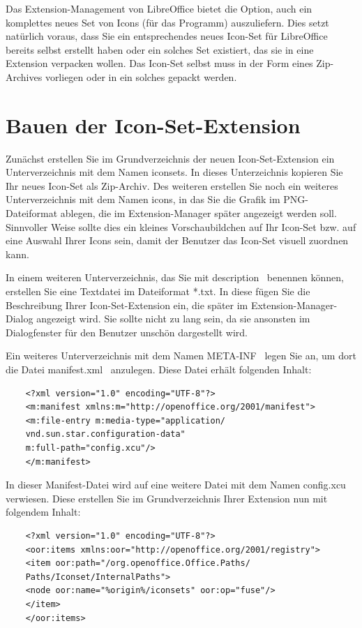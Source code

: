 \documentclass[12pt,a4paper,titlepage]{book}
\begin{document}
Das Extension-Management von LibreOffice bietet die Option, auch ein komplettes neues Set von Icons (für das Programm) auszuliefern. Dies setzt natürlich voraus, dass Sie ein
entsprechendes neues Icon-Set für LibreOffice bereits selbst erstellt haben oder ein solches Set existiert, das sie in eine Extension verpacken wollen. Das Icon-Set selbst muss in der Form eines Zip-Archives vorliegen oder in ein solches gepackt werden.

\section{Bauen der Icon-Set-Extension}

Zunächst erstellen Sie im Grundverzeichnis der neuen Icon-Set-Extension ein Unterverzeichnis mit dem Namen \glqq iconsets\grqq. In dieses Unterzeichnis kopieren Sie Ihr neues Icon-Set als Zip-Archiv. Des weiteren erstellen Sie noch ein weiteres Unterverzeichnis mit dem Namen \glqq icons\grqq, in das Sie die Grafik im PNG-Dateiformat ablegen, die im Extension-Manager später angezeigt werden soll. Sinnvoller Weise sollte dies ein kleines Vorschaubildchen auf Ihr Icon-Set bzw. auf eine Auswahl Ihrer Icons sein, damit der Benutzer das Icon-Set visuell zuordnen 
kann.

In einem weiteren Unterverzeichnis, das Sie mit \glqq description\grqq~ benennen können, erstellen Sie eine Textdatei im Dateiformat *.txt. In diese fügen Sie die Beschreibung Ihrer Icon-Set-Extension ein, die später im Extension-Manager-Dialog angezeigt wird. Sie sollte nicht zu lang sein, da sie ansonsten im Dialogfenster für den Benutzer unschön dargestellt wird.

Ein weiteres Unterverzeichnis mit dem Namen \glqq META-INF\grqq~ legen Sie an, um dort die Datei \glqq manifest.xml\grqq~ anzulegen. Diese Datei erhält folgenden Inhalt:

\begin{lstlisting}
	<?xml version="1.0" encoding="UTF-8"?>
	<m:manifest xmlns:m="http://openoffice.org/2001/manifest">
	<m:file-entry m:media-type="application/
	vnd.sun.star.configuration-data"
	m:full-path="config.xcu"/>
	</m:manifest>
\end{lstlisting}

In dieser Manifest-Datei wird auf eine weitere Datei mit dem Namen \glqq config.xcu\grqq~ verwiesen. Diese erstellen Sie im Grundverzeichnis Ihrer Extension nun mit folgendem Inhalt:

\begin{lstlisting}
	<?xml version="1.0" encoding="UTF-8"?>
	<oor:items xmlns:oor="http://openoffice.org/2001/registry">
	<item oor:path="/org.openoffice.Office.Paths/
	Paths/Iconset/InternalPaths">
	<node oor:name="%origin%/iconsets" oor:op="fuse"/>
	</item>
	</oor:items>
\end{lstlisting}
\end{document}
